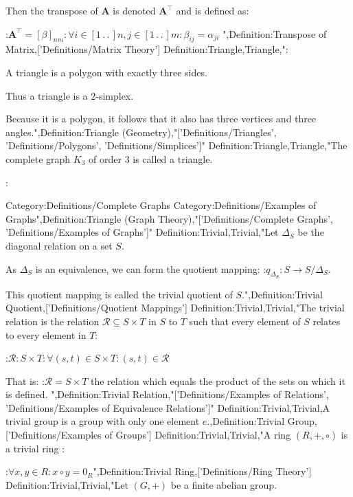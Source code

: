 Then the transpose of $\mathbf A$ is denoted $\mathbf A^\intercal$ and is defined as:

:$\mathbf A^\intercal = \left[ \beta \right]_{n m}: \forall i \in \left[ 1 \,.\,.\,   \right]n, j \in \left[ 1 \,.\,.\,   \right]m: \beta_{i j} = \alpha_{j i}$
",Definition:Transpose of Matrix,['Definitions/Matrix Theory']
Definition:Triangle,Triangle,":

A triangle is a polygon with exactly three sides.


Thus a triangle is a $2$-simplex.


Because it is a polygon, it follows that it also has three vertices and three angles.",Definition:Triangle (Geometry),"['Definitions/Triangles', 'Definitions/Polygons', 'Definitions/Simplices']"
Definition:Triangle,Triangle,"The complete graph $K_3$ of order $3$ is called a triangle.

:

Category:Definitions/Complete Graphs
Category:Definitions/Examples of Graphs",Definition:Triangle (Graph Theory),"['Definitions/Complete Graphs', 'Definitions/Examples of Graphs']"
Definition:Trivial,Trivial,"Let $\Delta_S$ be the diagonal relation on a set $S$.

As $\Delta_S$ is an equivalence, we can form the quotient mapping:
:$q_{\Delta_S}: S \to S / \Delta_S$.


This quotient mapping is called the trivial quotient of $S$.",Definition:Trivial Quotient,['Definitions/Quotient Mappings']
Definition:Trivial,Trivial,"The trivial relation is the relation $\mathcal R \subseteq S \times T$ in $S$ to $T$ such that every element of $S$ relates to every element in $T$:

:$\mathcal R: S \times T: \forall \left( s, t \right) \in S \times T: \left( s, t \right) \in \mathcal R$


That is:
:$\mathcal R = S \times T$
the relation which equals the product of the sets on which it is defined.
",Definition:Trivial Relation,"['Definitions/Examples of Relations', 'Definitions/Examples of Equivalence Relations']"
Definition:Trivial,Trivial,A trivial group is a group with only one element $e$.,Definition:Trivial Group,['Definitions/Examples of Groups']
Definition:Trivial,Trivial,"A ring $\left( R, +, \circ \right)$ is a trivial ring :

:$\forall x, y \in R: x \circ y = 0_R$",Definition:Trivial Ring,['Definitions/Ring Theory']
Definition:Trivial,Trivial,"Let $\left( G, + \right)$ be a finite abelian group.

